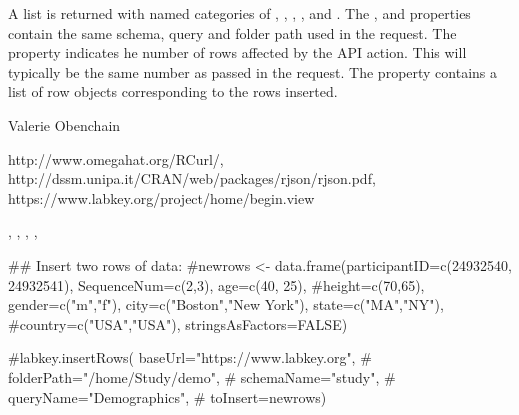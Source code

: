\documentclass{article}
\begin{document}
\begin{Value}
A list is returned with named categories of , , , ,  and .
The ,  and  properties contain the same schema, query 
and folder path used in the request.  The
 property indicates he number of rows affected by the API action. This will typically be the same
number as passed in the request. The  property contains a list of row objects corresponding to the rows 
inserted.
\end{Value}
\begin{Author}\relax
Valerie Obenchain
\end{Author}
\begin{References}\relax
http://www.omegahat.org/RCurl/,\\ 
http://dssm.unipa.it/CRAN/web/packages/rjson/rjson.pdf,\\
https://www.labkey.org/project/home/begin.view
\end{References}
\begin{SeeAlso}\relax
{}, , , 
, 
\end{SeeAlso}
\begin{Examples}
\begin{ExampleCode}

## Insert two rows of data:
#newrows <- data.frame(participantID=c(24932540, 24932541), SequenceNum=c(2,3), age=c(40, 25), 
#height=c(70,65), gender=c("m","f"), city=c("Boston","New York"), state=c("MA","NY"), 
#country=c("USA","USA"), stringsAsFactors=FALSE)

#labkey.insertRows(     baseUrl="https://www.labkey.org",       
#                                       folderPath="/home/Study/demo", 
#                                       schemaName="study",     
#                                       queryName="Demographics", 
#                                       toInsert=newrows)


\end{ExampleCode}
\end{Examples}
\end{document}
